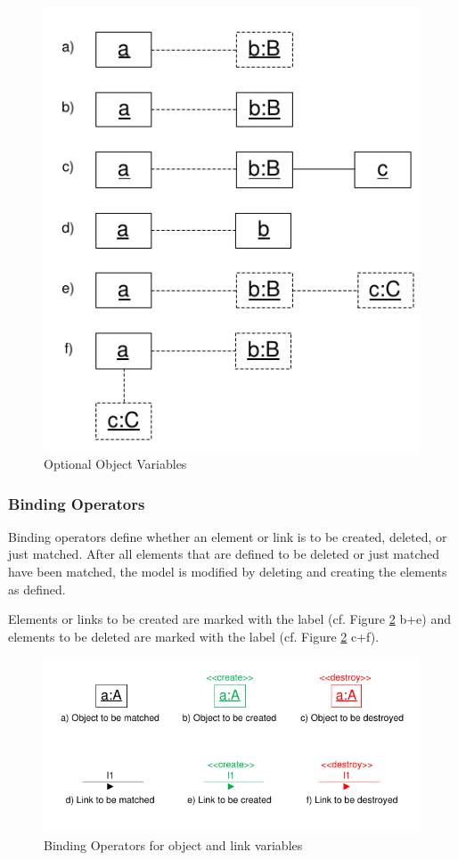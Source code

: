 \begin{figure}[htbp]
  \centering
  \includegraphics[scale=1]{figures/optionalObjects}
  \caption{Optional Object Variables}
  \label{fig:optionalObjects}
\end{figure}

\subsubsection{Binding Operators}
\label{sec:StoryPatterns:binding:operators}
Binding operators define whether an element or link is to be created, deleted,
or just matched.
After all elements that are defined to be deleted or just matched have been
matched, the model is modified by deleting and creating the elements as
defined.

Elements or links to be created are marked with the
label \create (cf. Figure \ref{fig:bindingOperatorsOverview} b+e) and elements
to be deleted are marked with the label \destroy (cf. Figure
\ref{fig:bindingOperatorsOverview} c+f).

\begin{figure}[htbp]
  \centering
  \includegraphics[scale=1.2]{figures/BindingOperatorsOverview}
  \caption{Binding Operators for object and link variables}
  \label{fig:bindingOperatorsOverview}
\end{figure}

